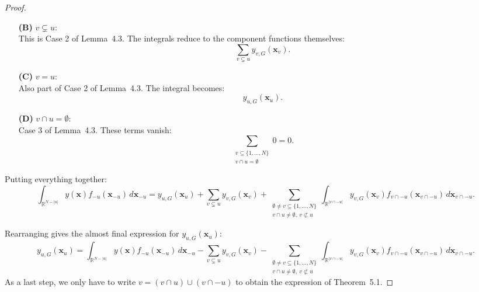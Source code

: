 \begin{proof}
\begin{itemize}
  \item[\textbf{(B)}] \( v \subsetneq u \): \\
  This is Case 2 of Lemma~4.3. The integrals reduce to the component functions themselves:
  \[
  \sum_{v \subsetneq u} y_{v,G}(\mathbf{x}_v).
  \]

  \item[\textbf{(C)}] \( v = u \): \\
  Also part of Case 2 of Lemma~4.3. The integral becomes:
  \[
  y_{u,G}(\mathbf{x}_u).
  \]

  \item[\textbf{(D)}] \( v \cap u = \emptyset \): \\
  Case 3 of Lemma~4.3. These terms vanish:
  \[
  \sum_{\substack{v \subseteq \{1,\dots,N\} \\ v \cap u = \emptyset}} 0 = 0.
  \]
\end{itemize}

Putting everything together:
\[
\int_{\mathbb{R}^{N - |u|}} y(\mathbf{x}) f_{-u}(\mathbf{x}_{-u}) \, d\mathbf{x}_{-u}
= y_{u,G}(\mathbf{x}_u)
+ \sum_{v \subsetneq u} y_{v,G}(\mathbf{x}_v)
+ \sum_{\substack{\emptyset \ne v \subseteq \{1,\dots,N\} \\ v \cap u \ne \emptyset,\ v \not\subset u}} 
\int_{\mathbb{R}^{|v \cap -u|}} y_{v,G}(\mathbf{x}_v) f_{v \cap -u}(\mathbf{x}_{v \cap -u}) \, d\mathbf{x}_{v \cap -u}.
\]

Rearranging gives the almost final expression for \( y_{u,G}(\mathbf{x}_u) \):
\[
y_{u,G}(\mathbf{x}_u)
= \int_{\mathbb{R}^{N - |u|}} y(\mathbf{x}) f_{-u}(\mathbf{x}_{-u}) \, d\mathbf{x}_{-u}
- \sum_{v \subsetneq u} y_{v,G}(\mathbf{x}_v)
- \sum_{\substack{\emptyset \ne v \subseteq \{1,\dots,N\} \\ v \cap u \ne \emptyset,\ v \not\subset u}} 
\int_{\mathbb{R}^{|v \cap -u|}} y_{v,G}(\mathbf{x}_v) f_{v \cap -u}(\mathbf{x}_{v \cap -u}) \, d\mathbf{x}_{v \cap -u}.
\]
As a last step, we only have to write \( v = (v \cap u) \cup (v \cap -u) \) to obtain the expression of Theorem~5.1.

\end{proof}

